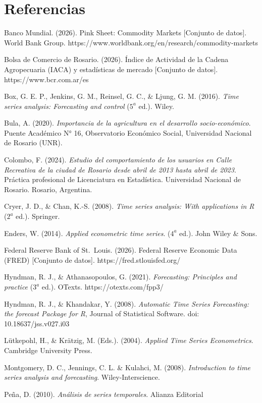 \documentclass[12pt]{article}
\begin{document}
\newpage

\section{Referencias}\label{referencias}

Banco Mundial. (2026). Pink Sheet: Commodity Markets {[}Conjunto de
datos{]}. World Bank Group.
https://www.worldbank.org/en/research/commodity-markets

Bolsa de Comercio de Rosario. (2026). Índice de Actividad de la Cadena
Agropecuaria (IACA) y estadísticas de mercado {[}Conjunto de datos{]}.
https://www.bcr.com.ar/es

Box, G. E. P., Jenkins, G. M., Reinsel, G. C., \& Ljung, G. M. (2016).
\emph{Time series analysis: Forecasting and control} (\(5^a\) ed.).
Wiley.

Bula, A. (2020). \emph{Importancia de la agricultura en el desarrollo
socio-económico}. Puente Académico N° 16, Observatorio Económico Social,
Universidad Nacional de Rosario (UNR).

Colombo, F. (2024). \emph{Estudio del comportamiento de los usuarios en
Calle Recreativa de la ciudad de Rosario desde abril de 2013 hasta abril
de 2023}. Práctica profesional de Licenciatura en Estadística.
Universidad Nacional de Rosario. Rosario, Argentina.

Cryer, J. D., \& Chan, K.-S. (2008). \emph{Time series analysis: With
applications in R} (\(2^a\) ed.). Springer.

Enders, W. (2014). \emph{Applied econometric time series}. (\(4^a\)
ed.). John Wiley \& Sons.

Federal Reserve Bank of St.~Louis. (2026). Federal Reserve Economic Data
(FRED) {[}Conjunto de datos{]}. https://fred.stlouisfed.org/

Hyndman, R. J., \& Athanasopoulos, G. (2021). \emph{Forecasting:
Principles and practice} (\(3^a\) ed.). OTexts. https://otexts.com/fpp3/

Hyndman, R. J., \& Khandakar, Y. (2008). \emph{Automatic Time Series
Forecasting: the forecast Package for R}, Journal of Statistical
Software. doi: 10.18637/jss.v027.i03

Lütkepohl, H., \& Krätzig, M. (Eds.). (2004). \emph{Applied Time Series
Econometrics}. Cambridge University Press.

Montgomery, D. C., Jennings, C. L. \& Kulahci, M. (2008).
\emph{Introduction to time series analysis and forecasting}.
Wiley-Interscience.

Peña, D. (2010). \emph{Análisis de series temporales}. Alianza Editorial
\end{document}
